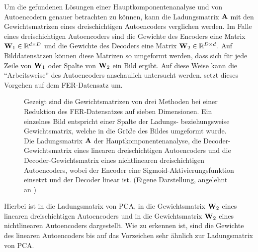 Um die gefundenen Lösungen einer Hauptkomponentenanalyse und von Autoencodern genauer betrachten zu
können, kann die Ladungsmatrix $\mathbf{A}$ mit den Gewichtsmatrizen eines dreischichtigen
Autoencoders verglichen werden. Im Falle eines dreischichtigen Autoencoders sind die Gewichte des
Encoders eine Matrix $\mathbf{W}_1 \in \mathbb{R}^{d \times D}$ und die Gewichte des Decoders eine Matrix
$\mathbf{W}_2 \in \mathbb{R}^{D \times d}$. Auf Bilddatensätzen können diese Matrizen so umgeformt werden,
dass sich für jede Zeile von $\mathbf{W}_1$ oder Spalte von $\mathbf{W}_2$ ein Bild ergibt. Auf diese
Weise kann die \enquote{Arbeitsweise} des Autoencoders anschaulich untersucht werden.
 setzt dieses Vorgehen auf dem FER-Datensatz um.
\begin{figure}[ht]
	\centering
	
	\caption[Die Gewichtsmatrizen von ausgewählten Methoden auf dem FER-Datensatz]{Gezeigt sind die Gewichtsmatrizen von drei Methoden bei einer Reduktion des FER-Datensatzes auf sieben Dimensionen. Ein einzelnes Bild entspricht einer Spalte der Ladungs- beziehungsweise Gewichtsmatrix, welche in die Größe des Bildes umgeformt wurde. \captiona Die Ladungsmatrix $\mathbf{A}$ der Hauptkomponentenanalyse, \captionb die Decoder-Gewichtsmatrix eines linearen dreischichtigen Autoencoders und \captionc die Decoder-Gewichtsmatrix eines nichtlinearen dreischichtigen Autoencoders, wobei der Encoder eine Sigmoid-Aktivierungsfunktion einsetzt und der Decoder linear ist. (Eigene Darstellung, angelehnt an \textcite[5]{Plaut.2018})}
	\label{fig:Gewichtsvergleich}
\end{figure}
Hierbei ist in \captiona die Ladungsmatrix von PCA, in \captionb die Gewichtsmatrix $\mathbf{W}_2$ eines linearen dreischichtigen Autoencoders und in \captionc die Gewichtsmatrix $\mathbf{W}_2$ eines nichtlinearen Autoencoders dargestellt. Wie zu erkennen ist, sind
die Gewichte des linearen Autoencoders bis auf das Vorzeichen sehr ähnlich zur Ladungsmatrix von
PCA.